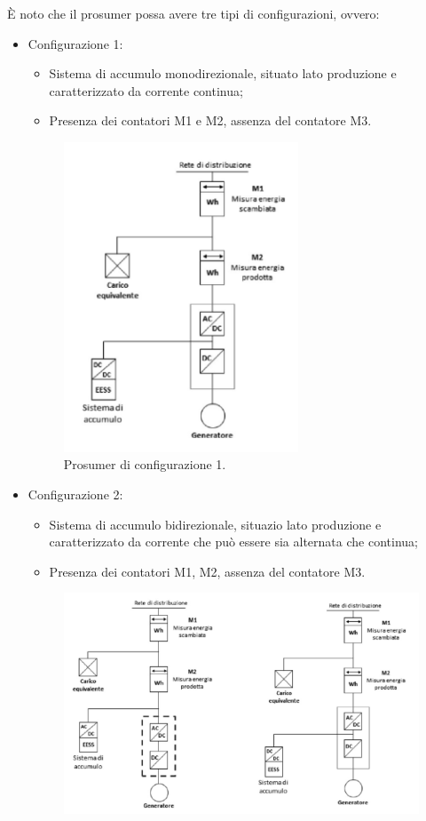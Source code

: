 È noto che il prosumer possa avere tre tipi di configurazioni, ovvero:
\begin{itemize}
    \item Configurazione 1:
          \begin{itemize}
              \item Sistema di accumulo monodirezionale, situato lato produzione e caratterizzato da corrente continua;
              \item Presenza dei contatori M1 e M2, assenza del contatore M3.
          \end{itemize}
          \begin{figure}[H]
              \centering
              \includegraphics[width=7cm]{images/config01.png}
              \caption{Prosumer di configurazione 1.}
              \label{fig:Prosumer_configurazione_1}
          \end{figure}
    \item Configurazione 2:
          \begin{itemize}
              \item Sistema di accumulo bidirezionale, situazio lato produzione e caratterizzato da corrente che può essere sia alternata che continua;
              \item Presenza dei contatori M1, M2, assenza del contatore M3.
          \end{itemize}
          \begin{figure}[H]
            \centering
            \includegraphics[width=11cm]{images/config02.png}

\end{figure}
\end{itemize}
